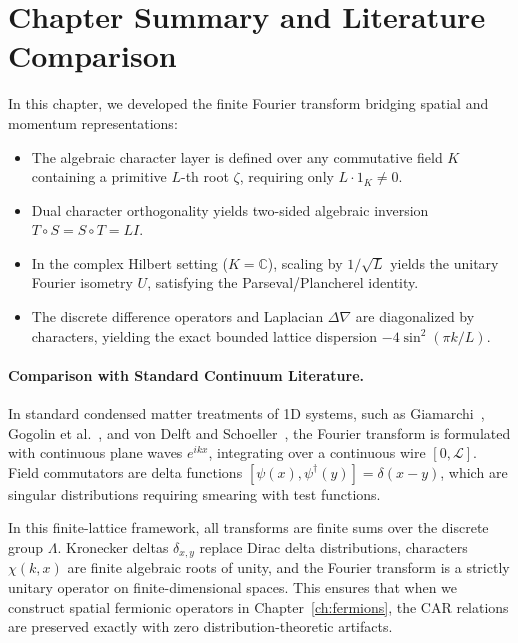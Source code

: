 \section{Chapter Summary and Literature Comparison}

In this chapter, we developed the finite Fourier transform bridging spatial and momentum representations:
\begin{itemize}
    \item The algebraic character layer is defined over any commutative field $K$ containing a primitive $L$-th root $\zeta$, requiring only $L \cdot 1_K \neq 0$.
    \item Dual character orthogonality yields two-sided algebraic inversion $T \circ S = S \circ T = L I$.
    \item In the complex Hilbert setting ($K = \mathbb{C}$), scaling by $1/\sqrt{L}$ yields the unitary Fourier isometry $U$, satisfying the Parseval/Plancherel identity.
    \item The discrete difference operators and Laplacian $\Delta\nabla$ are diagonalized by characters, yielding the exact bounded lattice dispersion $-4\sin^2(\pi k / L)$.
\end{itemize}

\paragraph{Comparison with Standard Continuum Literature.}
In standard condensed matter treatments of 1D systems, such as Giamarchi~\cite{giamarchi2004}, Gogolin et al.~\cite{gogolin1998}, and von Delft and Schoeller~\cite{vondelft1998}, the Fourier transform is formulated with continuous plane waves $e^{i k x}$, integrating over a continuous wire $[0, \mathcal{L}]$. Field commutators are delta functions $[\psi(x), \psi^\dagger(y)] = \delta(x-y)$, which are singular distributions requiring smearing with test functions.

In this finite-lattice framework, all transforms are finite sums over the discrete group $\Lambda$. Kronecker deltas $\delta_{x, y}$ replace Dirac delta distributions, characters $\chi(k, x)$ are finite algebraic roots of unity, and the Fourier transform is a strictly unitary operator on finite-dimensional spaces. This ensures that when we construct spatial fermionic operators in Chapter~\ref{ch:fermions}, the CAR relations are preserved exactly with zero distribution-theoretic artifacts.
